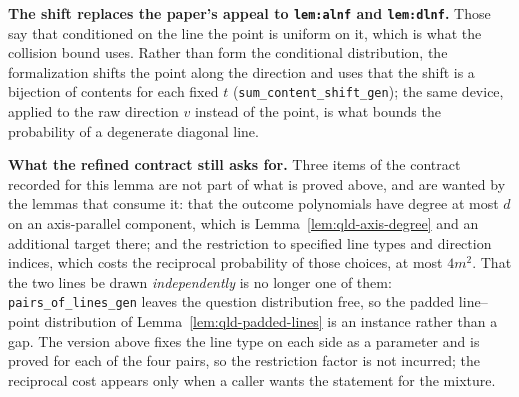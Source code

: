 \textbf{The shift replaces the paper's appeal to \texttt{lem:alnf} and \texttt{lem:dlnf}.} Those
say that conditioned on the line the point is uniform on it, which is what the collision bound
uses. Rather than form the conditional distribution, the formalization shifts the point along the
direction and uses that the shift is a bijection of contents for each fixed $t$
(\texttt{sum\_content\_shift\_gen}); the same device, applied to the raw direction $v$ instead of
the point, is what bounds the probability of a degenerate diagonal line.

\textbf{What the refined contract still asks for.} Three items of the contract recorded for this
lemma are not part of what is proved above, and are wanted by the lemmas that consume it: that the
outcome polynomials have degree at most $d$ on an axis-parallel component, which is
Lemma~\ref{lem:qld-axis-degree} and an additional target there; and the restriction to
specified line types and direction indices, which costs the reciprocal probability of those
choices, at most $4m^2$. That the two lines be drawn \emph{independently} is no longer one of them:
\texttt{pairs\_of\_lines\_gen} leaves the question distribution free, so the padded line--point
distribution of Lemma~\ref{lem:qld-padded-lines} is an instance rather than a gap. The version above fixes the line type on each side as a parameter and is
proved for each of the four pairs, so the restriction factor is not incurred; the reciprocal cost
appears only when a caller wants the statement for the mixture.

\effortMedium

